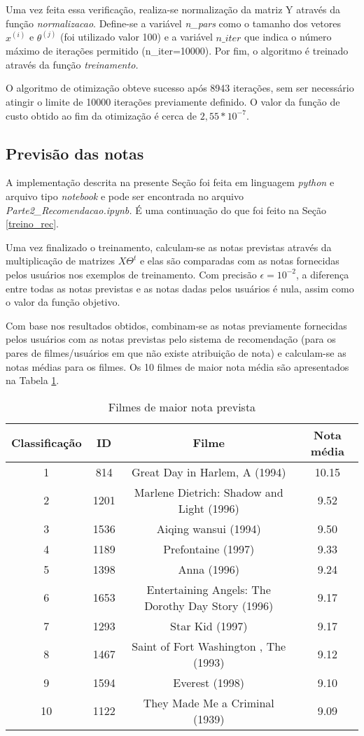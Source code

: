 \documentclass[12pt]{article}
\begin{document}
Uma vez feita essa verificação, realiza-se normalização da matriz Y através da função \textit{normalizacao}. Define-se a variável \textit{n\_pars} como o tamanho dos vetores $x^{(i)}$ e $\theta^{(j)}$ (foi utilizado valor 100) e a variável $n\_iter$ que indica o número máximo de iterações permitido (n\_iter=10000). Por fim, o algoritmo é treinado através da função \textit{treinamento.}

O algoritmo de otimização obteve sucesso após 8943 iterações, sem ser necessário atingir o limite de 10000 iterações previamente definido. O valor da função de custo obtido ao fim da otimização é cerca de $2,55 * 10^{-7}$.

\subsection{Previsão das notas} \label{notas_rec}
A implementação descrita na presente Seção foi feita em linguagem \textit{python} e arquivo tipo \textit{notebook} e pode ser encontrada no arquivo \textit{Parte2\_Recomendacao.ipynb.} É uma continuação do que foi feito na Seção \ref{treino_rec}.

Uma vez finalizado o treinamento, calculam-se as notas previstas através da multiplicação de matrizes $X\Theta^t$ e elas são comparadas com as notas fornecidas pelos usuários nos exemplos de treinamento. Com precisão $\epsilon = 10^{-2}$, a diferença entre todas as notas previstas e as notas dadas pelos usuários é nula, assim como o valor da função objetivo.

Com base nos resultados obtidos, combinam-se as notas previamente fornecidas pelos usuários com as notas previstas pelo sistema de recomendação (para os pares de filmes/usuários em que não existe atribuição de nota) e calculam-se as notas médias para os filmes. Os 10 filmes de maior nota média são apresentados na Tabela \ref{tabela_rec}.  

\begin{table} [h]
\begin{tabular}{cccc}
\hline 
Classificação & ID & Filme & Nota média\\
\hline
1 & 814 & Great Day in Harlem,  A (1994) & 10.15\\
2 & 1201 & Marlene Dietrich: Shadow and Light (1996)  & 9.52\\
3 & 1536 & Aiqing wansui (1994) & 9.50\\
4 & 1189 & Prefontaine (1997) & 9.33\\
5 & 1398 & Anna (1996) & 9.24\\
6 & 1653 & Entertaining Angels: The Dorothy Day Story (1996) & 9.17\\
7 & 1293 & Star Kid (1997) & 9.17\\
8 & 1467 & Saint of Fort Washington ,  The (1993) & 9.12\\
9 & 1594 & Everest (1998) & 9.10\\
10 & 1122 & They Made Me a Criminal (1939) & 9.09\\
\hline 
\end{tabular} 
\caption{Filmes de maior nota prevista}
\label{tabela_rec}
\end{table}
\end{document}
